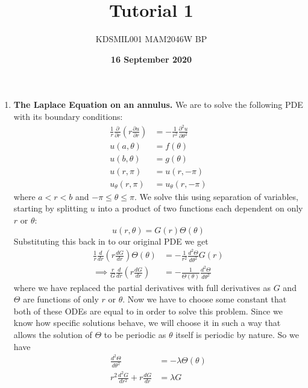 \documentclass[12pt]{article}
\title{Tutorial 1}
\author{KDSMIL001 \; MAM2046W BP}
\date{\textbf{16 September 2020}}
\begin{document}
    \maketitle
    
    \begin{enumerate}
        \item \textbf{The Laplace Equation on an annulus.}\newline
        We are to solve the following PDE with its boundary conditions:
        \begin{align*}
            \frac{1}{r}\frac{\partial}{\partial r} (r\frac{\partial u}{\partial r})&=-\frac{1}{r^2}\frac{\partial^2 u}{\partial \theta ^2} \\
            u(a,\theta)&=f(\theta)\\
            u(b,\theta)&=g(\theta)\\
            u(r,\pi)&=u(r,-\pi)\\
            u_{\theta}(r,\pi)&=u_{\theta}(r,-\pi)
        \end{align*}
        where $a<r<b$ and $-\pi\leq\theta\leq\pi$. We solve this using separation of variables, 
        starting by splitting $u$ into a product of two functions each dependent on only $r$ or $\theta$:
        \begin{equation*}
            u(r,\theta)=G(r)\Theta(\theta)
        \end{equation*}
        Substituting this back in to our original PDE we get 
        \begin{align*}
            \frac{1}{r}\frac{d}{dr}(r\frac{dG}{dr})\Theta(\theta)&=-\frac{1}{r^2}\frac{d^2\Theta}{d\theta^2}G(r)\\
            \implies \frac{r}{G}\frac{d}{dr}(r\frac{dG}{dr})&=-\frac{1}{\Theta(\theta)}\frac{d^2\Theta}{d\theta^2}
        \end{align*}
        where we have replaced the partial derivatives with full derivatives as $G$ and $\Theta$ are 
        functions of only $r$ or $\theta$. Now we have to choose some constant that both of these ODEs 
        are equal to in order to solve this problem. Since we know how specific solutions behave, we 
        will choose it in such a way that allows the solution of $\Theta$ to be periodic as $\theta$ 
        itself is periodic by nature. So we have 
        \begin{align*}
            \frac{d^2\Theta}{d\theta^2}&=-\lambda\Theta(\theta)\\
            r^2\frac{d^2G}{dr^2}+r\frac{dG}{dr}&=\lambda G

\end{align*}
\end{enumerate}
\end{document}
